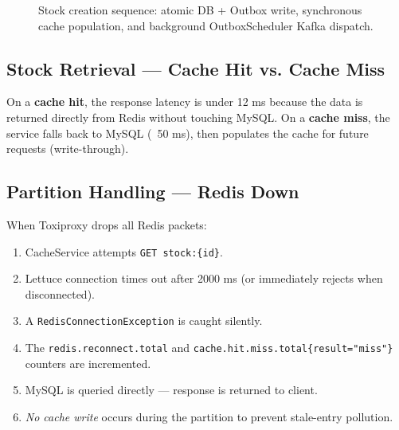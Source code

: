 \documentclass[12pt,a4paper,twoside]{article}
\begin{document}
\begin{figure}[H]
\centering
{}
\caption{Stock creation sequence: atomic DB + Outbox write, synchronous cache
  population, and background OutboxScheduler Kafka dispatch.}
\label{fig:create}
\end{figure}

\subsection{Stock Retrieval — Cache Hit vs. Cache Miss}

On a \textbf{cache hit}, the response latency is under 12 ms because
the data is returned directly from Redis without touching MySQL.
On a \textbf{cache miss}, the service falls back to MySQL (~50 ms),
then populates the cache for future requests (write-through).

\subsection{Partition Handling — Redis Down}

When Toxiproxy drops all Redis packets:

\begin{enumerate}[noitemsep]
  \item CacheService attempts \texttt{GET stock:\{id\}}.
  \item Lettuce connection times out after 2000 ms (or immediately rejects when disconnected).
  \item A \texttt{RedisConnectionException} is caught silently.
  \item The \texttt{redis.reconnect.total} and \texttt{cache.hit.miss.total\{result="miss"\}} counters are incremented.
  \item MySQL is queried directly — response is returned to client.
  \item \emph{No cache write} occurs during the partition to prevent
        stale-entry pollution.
\end{enumerate}
\end{document}
